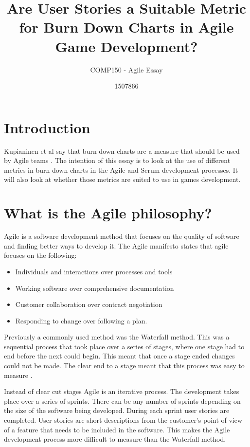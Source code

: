 \documentclass{scrartcl}
\title{Are User Stories a Suitable Metric for Burn Down Charts in Agile Game Development?}
\subtitle{COMP150 - Agile Essay}
\author{1507866}
\begin{document}
	
\maketitle
	
	
\section{Introduction}

Kupianinen et al say that burn down charts are a measure that should be used by Agile teams \cite{Kupiainen}. The intention of this essay is to look at the use of different metrics in burn down charts in the Agile and Scrum development processes. It will also look at whether those metrics are suited to use in games development.

\section{What is the Agile philosophy?}

Agile is a software development method that focuses on the quality of software and finding better ways to develop it. The Agile manifesto states that agile focuses on the following:

\begin{itemize}
	\item Individuals and interactions over processes and tools
	\item Working software over comprehensive documentation
	\item Customer collaboration over contract negotiation
	\item Responding to change over following a plan. \cite{AgileManifesto}  
\end{itemize} 

Previously a commonly used method was the Waterfall method. This was a sequential process that took place over a series of stages, where one stage had to end before the next could begin. This meant that once a stage ended changes could not be made. The clear end to a stage meant that this process was easy to measure \cite{Duka}.

Instead of clear cut stages Agile is an iterative process. The development takes place over a series of sprints. There can be any number of sprints depending on the size of the software being developed.  During each sprint user stories are completed. User stories are short descriptions from the customer's point of view of a feature that needs to be included in the software. This makes the Agile development process more difficult to measure than the Waterfall method.%
\end{document}
